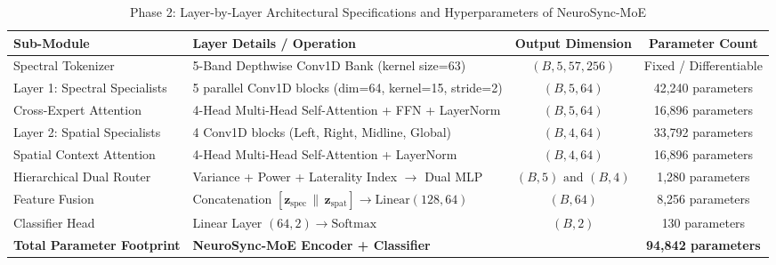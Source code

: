 \begin{table}[t]
\centering
\caption{Phase 2: Layer-by-Layer Architectural Specifications and Hyperparameters of NeuroSync-MoE}
\label{tab:phase2_hyperparameters}
\begin{tabular}{llcc}
\hline
\textbf{Sub-Module} & \textbf{Layer Details / Operation} & \textbf{Output Dimension} & \textbf{Parameter Count} \\
\hline
Spectral Tokenizer & 5-Band Depthwise Conv1D Bank (kernel size=63) & $(B, 5, 57, 256)$ & Fixed / Differentiable \\
Layer 1: Spectral Specialists & 5 parallel Conv1D blocks (dim=64, kernel=15, stride=2) & $(B, 5, 64)$ & 42,240 parameters \\
Cross-Expert Attention & 4-Head Multi-Head Self-Attention + FFN + LayerNorm & $(B, 5, 64)$ & 16,896 parameters \\
Layer 2: Spatial Specialists & 4 Conv1D blocks (Left, Right, Midline, Global) & $(B, 4, 64)$ & 33,792 parameters \\
Spatial Context Attention & 4-Head Multi-Head Self-Attention + LayerNorm & $(B, 4, 64)$ & 16,896 parameters \\
Hierarchical Dual Router & Variance + Power + Laterality Index $\rightarrow$ Dual MLP & $(B, 5) \text{ and } (B, 4)$ & 1,280 parameters \\
Feature Fusion & Concatenation $[\mathbf{z}_{\text{spec}} \,\|\, \mathbf{z}_{\text{spat}}] \rightarrow \text{Linear}(128, 64)$ & $(B, 64)$ & 8,256 parameters \\
Classifier Head & Linear Layer $(64, 2) \rightarrow \text{Softmax}$ & $(B, 2)$ & 130 parameters \\
\hline
\textbf{Total Parameter Footprint} & \multicolumn{2}{l}{\textbf{NeuroSync-MoE Encoder + Classifier}} & \textbf{94,842 parameters} \\
\hline
\end{tabular}
\end{table}